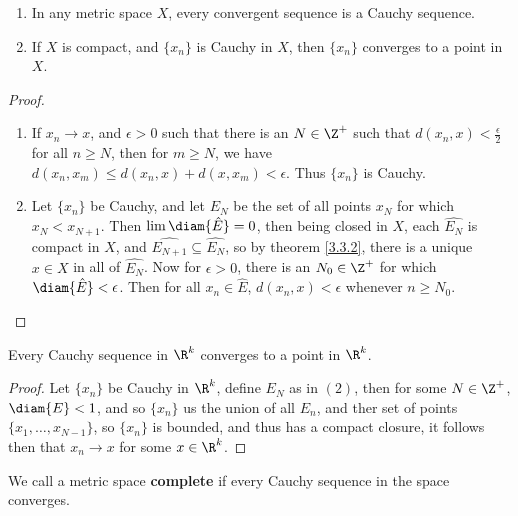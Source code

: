 \begin{theorem}\label{3.3.3}
    \begin{enumerate}[label=(\arabic*)]
        \item In any metric space $X$, every convergent sequence is a Cauchy sequence.

        \item If $X$ is compact, and  $\{x_n\}$ is Cauchy in  $X$, then $\{x_n\}$ 
            converges to a point in  $X$.
    \end{enumerate}
\end{theorem}
\begin{proof}
    \begin{enumerate}[label=(\arabic*)]
        \item If $x_n \rightarrow x$, and $\epsilon>0$ such that there is an  $N \in \Z^+$ such that 
            $d(x_n,x)<\frac{\epsilon}{2}$ for all $n \geq N$, then for  $m \geq N$, we have 
            $d(x_n,x_m) \leq d(x_n,x)+d(x,x_m)<\epsilon$. Thus  $\{x_n\}$ is Cauchy.

        \item Let $\{x_n\}$ be Cauchy, and let  $E_N$ be the set of all points  $x_N$ for 
            which  $x_N<x_{N+1}$. Then  $\lim{\diam{\hat{E}}}=0$, then being closed in  $X$, each 
            $\hat{E_N}$ is compact in  $X$, and  $\hat{E_{N+1}} \subseteq \hat{E_N}$, so 
            by theorem \ref{3.3.2}, there is a unique  $x \in X$ in all of $\hat{E_N}$. Now for 
            $\epsilon>0$, there is an  $N_0 \in \Z^+$ for which $\diam{\hat{E}}<\epsilon$. Then for all 
            $x_n \in \hat{E}$,  $d(x_n,x)<\epsilon$ whenever  $n \geq N_0$.
    \end{enumerate}		
\end{proof}

\begin{corollary}
    Every Cauchy sequence in $\R^k$ converges to a point in  $\R^k$.
\end{corollary}
\begin{proof}
    Let $\{x_n\}$ be Cauchy in  $\R^k$, define $E_N$ as in  $(2)$, then for some  $N \in \Z^+$, 
$\diam{E}<1$, and so  $\{x_n\}$ us the union of all  $E_n$, and ther set of points  
$\{x_1,\dots, x_{N-1}\}$, so $\{x_n\}$ is bounded, and thus has a compact closure, it follows then 
that  $x_n \rightarrow x$ for some  $x \in \R^k$.
\end{proof}

\begin{definition}
    We call a metric space \textbf{complete} if every Cauchy sequence in the space converges.		
\end{definition}

